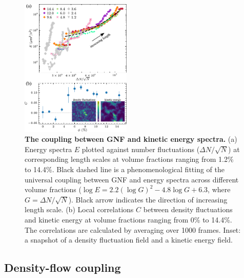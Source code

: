 \documentclass[twocolumn,aps,prx,amsmath,amssymb,longbibliography]{revtex4-2}
\begin{document}
\begin{figure}[!]
\begin{center}
\includegraphics[width=0.47\textwidth]{figures/GNF-energy-spectra-correlation/v5.pdf}
\caption[The correlation between GNF and kinetic energy and kinetic energy spectra.]
{
\textbf{The coupling between GNF and kinetic energy spectra.}
(a) Energy spectra $E$ plotted against number fluctuations ($\Delta N/\sqrt N$) at corresponding length scales at volume fractions ranging from 1.2\% to 14.4\%. Black dashed line is a phenomenological fitting of the universal coupling between GNF and energy spectra across different volume fractions ($\log E = 2.2 (\log G)^2 - 4.8 \log G + 6.3$, where $G=\Delta N/\sqrt N$). Black arrow indicates the direction of increasing length scale.
(b) Local correlations $C$ between density fluctuations and kinetic energy at volume fractions ranging from 0\% to 14.4\%. The correlations are calculated by averaging over 1000 frames. Inset: a snapshot of a density fluctuation field and a kinetic energy field.
}
\label{fig:GNF-energy-spectra-correlation}
\end{center}
\end{figure}

\subsection{Density-flow coupling}
\end{document}
